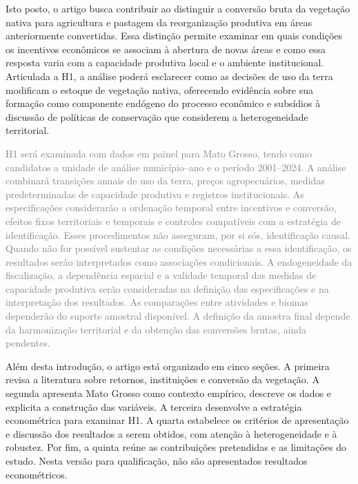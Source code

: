 Isto posto, o artigo busca contribuir ao distinguir a conversão bruta da vegetação nativa para agricultura e pastagem da reorganização produtiva em áreas anteriormente convertidas. Essa distinção permite examinar em quais condições os incentivos econômicos se associam à abertura de novas áreas e como essa resposta varia com a capacidade produtiva local e o ambiente institucional. Articulada a H1, a análise poderá esclarecer como as decisões de uso da terra modificam o estoque de vegetação nativa, oferecendo evidência sobre sua formação como componente endógeno do processo econômico e subsídios à discussão de políticas de conservação que considerem a heterogeneidade territorial.


\textcolor{gray}{H1 será examinada com dados em painel para Mato Grosso, tendo como candidatos a unidade de análise município--ano e o período 2001--2024. A análise combinará transições anuais de uso da terra, preços agropecuários, medidas predeterminadas de capacidade produtiva e registros institucionais. As especificações considerarão a ordenação temporal entre incentivos e conversão, efeitos fixos territoriais e temporais e controles compatíveis com a estratégia de identificação. Esses procedimentos não asseguram, por si sós, identificação causal. Quando não for possível sustentar as condições necessárias a essa identificação, os resultados serão interpretados como associações condicionais. A endogeneidade da fiscalização, a dependência espacial e a validade temporal das medidas de capacidade produtiva serão consideradas na definição das especificações e na interpretação dos resultados. As comparações entre atividades e biomas dependerão do suporte amostral disponível. A definição da amostra final depende da harmonização territorial e da obtenção das conversões brutas, ainda pendentes.}



Além desta introdução, o artigo está organizado em cinco seções. A primeira revisa a literatura sobre retornos, instituições e conversão da vegetação. A segunda apresenta Mato Grosso como contexto empírico, descreve os dados e explicita a construção das variáveis. A terceira desenvolve a estratégia econométrica para examinar H1. A quarta estabelece os critérios de apresentação e discussão dos resultados a serem obtidos, com atenção à heterogeneidade e à robustez. Por fim, a quinta reúne as contribuições pretendidas e as limitações do estudo. Nesta versão para qualificação, não são apresentados resultados econométricos.

